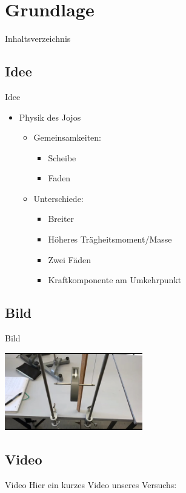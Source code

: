 \section{Grundlage}

\begin{frame}{Inhaltsverzeichnis}
\end{frame} 

\subsection{Idee}
\begin{frame}[t]{Idee}
    
\begin{itemize}
\item Physik des Jojos \pause %
\begin{itemize}
\item Gemeinsamkeiten: \pause %
\begin{itemize}
\item Scheibe \pause
\item Faden \pause 
\end{itemize}
\item Unterschiede: \pause %
\begin{itemize}
\item Breiter \pause
\item Höheres Trägheitsmoment/Masse \pause
\item Zwei Fäden \pause
\item Kraftkomponente am Umkehrpunkt \pause
\end{itemize}
\end{itemize}
\end{itemize}
\end{frame}

\subsection{Bild}
\begin{frame}{Bild}
    \begin{center}
        \includegraphics[width=0.45\textwidth, angle= 90]{build/Bild1.jpg} %
    \end{center}
\end{frame}

\subsection{Video}
\begin{frame}{Video}
    Hier ein kurzes Video unseres Versuchs:
    \begin{center}
    \end{center}
\end{frame}
